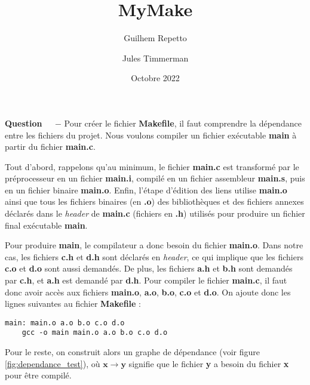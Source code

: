 \documentclass[11pt]{report}
\title{MyMake}
\date{Octobre 2022}
\author{Guilhem Repetto \and Jules Timmerman}
\newcounter{question}[section]
\newenvironment{question}[1][]{\refstepcounter{question}\par\medskip
   \noindent\textbf{Question~\thequestion ~ $-$} \rmfamily}{}
\begin{document}
\maketitle

\begin{abstract}

\end{abstract}



\begin{question} %
Pour créer le fichier \textbf{Makefile}, il faut comprendre la dépendance entre les fichiers du projet.
Nous voulons compiler un fichier exécutable \textbf{main} à partir du fichier \textbf{main.c}.

Tout d'abord, rappelons qu'au minimum, le fichier \textbf{main.c} est transformé par le préprocesseur en un fichier \textbf{main.i}, compilé en un fichier assembleur \textbf{main.s}, puis en un fichier binaire \textbf{main.o}. Enfin, l'étape d'édition des liens utilise \textbf{main.o} ainsi que tous les fichiers binaires (en \textbf{.o}) des bibliothèques et des fichiers annexes déclarés dans le \textit{header} de \textbf{main.c} (fichiers en \textbf{.h}) utilisés pour produire un fichier final exécutable \textbf{main}.


Pour produire \textbf{main}, le compilateur a donc besoin du fichier \textbf{main.o}. Dans notre cas, les fichiers \textbf{c.h} et \textbf{d.h} sont déclarés en \textit{header}, ce qui implique que les fichiers \textbf{c.o} et \textbf{d.o} sont aussi demandés. De plus, les fichiers \textbf{a.h} et \textbf{b.h} sont demandés par \textbf{c.h}, et \textbf{a.h} est demandé par \textbf{d.h}. Pour compiler le fichier \textbf{main.c}, il faut donc avoir accès aux fichiers \textbf{main.o}, \textbf{a.o}, \textbf{b.o}, \textbf{c.o} et \textbf{d.o}.
On ajoute donc les lignes suivantes au fichier \textbf{Makefile} :
\begin{verbatim}
main: main.o a.o b.o c.o d.o
    gcc -o main main.o a.o b.o c.o d.o
\end{verbatim}

Pour le reste, on construit alors un graphe de dépendance (voir figure \ref{fig:dependance_test}), où $\mathbf{x}\rightarrow \mathbf{y}$ signifie que le fichier \textbf{y} a besoin du fichier \textbf{x} pour être compilé.



\end{question}
\end{document}
